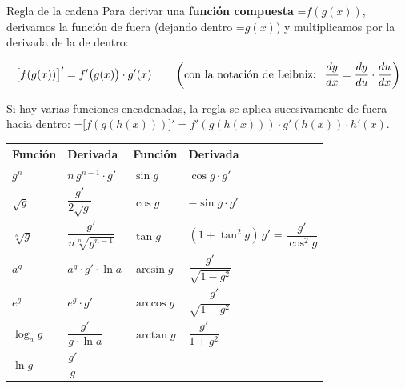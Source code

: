 \documentclass[11pt,a4paper]{article}
\newcommand{\fmm}[1]{\setbox0=\hbox{$#1$}\ifdim\wd0>\linewidth\fmdisp{#1}\else\mbox{\box0}\fi}
\newcommand{\fmdisp}[1]{\[\setbox2=\hbox{$\displaystyle #1$}\ifdim\wd2>\linewidth\resizebox{\linewidth}{!}{\box2}\else\box2\fi\]}
\begin{document}
\begin{fmdef}{Regla de la cadena}
Para derivar una \textbf{función compuesta} \fmm{f(g(x))}, derivamos la función de fuera (dejando dentro \fmm{g(x)}) y multiplicamos por la derivada de la de dentro:

\fmdisp{\big[f(g(x))\big]'=f'\big(g(x)\big)\cdot g'(x)\qquad\left(\text{con la notación de Leibniz: }\ \frac{dy}{dx}=\frac{dy}{du}\cdot\frac{du}{dx}\right)}

Si hay varias funciones encadenadas, la regla se aplica sucesivamente de fuera hacia dentro: \fmm{\big[f(g(h(x)))\big]'=f'(g(h(x)))\cdot g'(h(x))\cdot h'(x)}.

\begin{center}\renewcommand{\arraystretch}{1.5}\small\begin{tabularx}{\linewidth}{>{\raggedright\arraybackslash}p{3.2cm}>{\raggedright\arraybackslash}X>{\raggedright\arraybackslash}X>{\raggedright\arraybackslash}X}\toprule
\textbf{Función} & \textbf{Derivada} & \textbf{Función} & \textbf{Derivada}\\\midrule
$g^n$ & $n\,g^{n-1}\cdot g'$ & $\sin g$ & $\cos g\cdot g'$\\[3pt]
$\sqrt{g}$ & $\dfrac{g'}{2\sqrt{g}}$ & $\cos g$ & $-\sin g\cdot g'$\\[3pt]
$\sqrt[n]{g}$ & $\dfrac{g'}{n\sqrt[n]{g^{n-1}}}$ & $\tan g$ & $(1+\tan^2g)\,g'=\dfrac{g'}{\cos^2g}$\\[3pt]
$a^{g}$ & $a^{g}\cdot g'\cdot\ln a$ & $\arcsin g$ & $\dfrac{g'}{\sqrt{1-g^2}}$\\[3pt]
$e^{g}$ & $e^{g}\cdot g'$ & $\arccos g$ & $\dfrac{-g'}{\sqrt{1-g^2}}$\\[3pt]
$\log_a g$ & $\dfrac{g'}{g\cdot\ln a}$ & $\arctan g$ & $\dfrac{g'}{1+g^2}$\\[3pt]
$\ln g$ & $\dfrac{g'}{g}$ &  & \\[3pt]
\bottomrule\end{tabularx}\end{center}
\end{fmdef}
\end{document}
